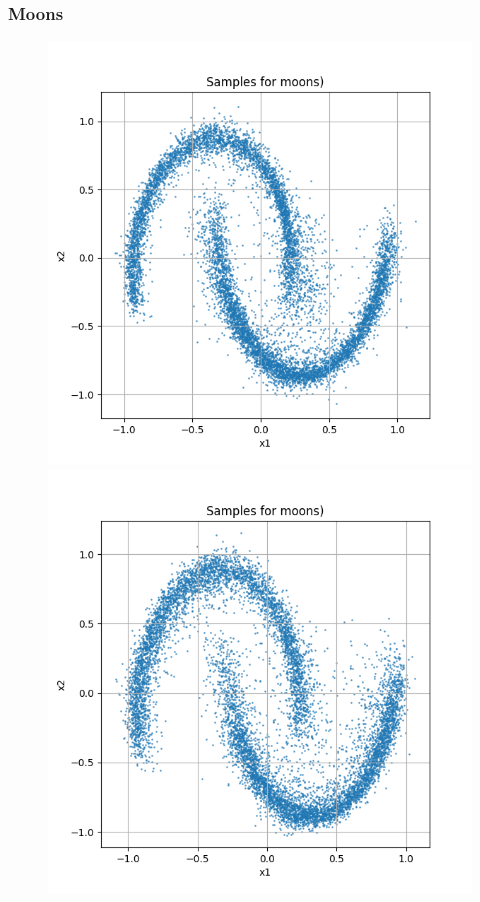 \documentclass[a4paper,12pt]{article}
\begin{document}
\subsubsection*{Moons}
\begin{figure}[H]
  \centering
  \begin{minipage}{0.3\textwidth}
      \centering
      \includegraphics[width=\linewidth]{images/Samples for ddpm_2_200_0.0001_0.02_moons_linear.png}
  \end{minipage}
  \begin{minipage}{0.3\textwidth}
      \centering
      \includegraphics[width=\linewidth]{images/Samples for ddpm_2_200_0.0001_0.02_moons_cosine.png}

\end{minipage}
\end{figure}
\end{document}
